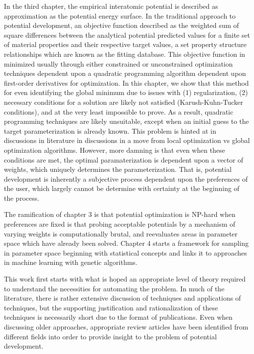 In the third chapter, the empirical interatomic potential is described as approximation as the potential energy surface.
In the traditional approach to potential development, an objective function described as the weighted sum of square differences between the analytical potential predicted values for a finite set of material properties and their respective target values, a set property structure relationships which are known as the fitting database.
This objective function in minimized usually through either constrained or unconstrained optimization techniques dependent upon a quadratic programming algorithm dependent upon first-order derivatives for optimization.  In this chapter, we show that this method for even identifying the global minimum due to issues with (1) regularization, (2) necessary conditions for a solution are likely not satisfied (Karush-Kuhn-Tucker conditions), and at the very least impossible to prove.
As a result, quadratic programming techniques are likely unsuitable, except when an initial guess to the target parameterization is already known.
This problem is hinted at in discussions in literature in discussions in a move from local optimization vs global optimization algorithms.
However, more damning is that even when these conditions are met, the optimal paramaterization is dependent upon a vector of weights, which uniquely determines the parameterization.
That is, potential development is inherently a subjective process dependent upon the preferences of the user, which largely cannot be determine with certainty at the beginning of the process.

The ramification of chapter 3 is that potential optimization is NP-hard when preferences are fixed is that probing acceptable potentials by a mechanism of varying weights is computationally brutal, and reevaluates areas in parameter space which have already been solved.
Chapter 4 starts a framework for sampling in parameter space beginning with statistical concepts and links it to approaches in machine learning with genetic algorithms.

This work first starts with what is hoped an appropriate level of theory required to understand the necessities for automating the problem.
In much of the literature, there is rather extensive discussion of techniques and applications of techniques, but the supporting justification and rationalization of these techniques is necessarily short due to the format of publications.
Even when discussing older approaches, appropriate review articles have been identified from different fields into order to provide insight to the problem of potential development.


